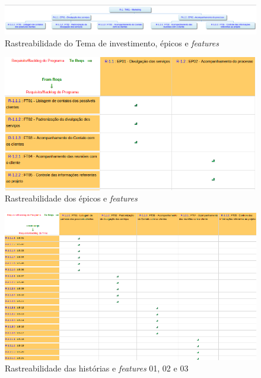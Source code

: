\begin{figure}[!htb]
 \centering
 \includegraphics[scale= 0.5, angle=-90]{figuras/rastreabilidade_ferramenta.png}
 \caption{Rastreabilidade do Tema de investimento, épicos e \textit{features}}
 \label{fig:rastreabilidade}
\end{figure}

\begin{figure}[!htb]
 \centering
 \includegraphics[scale= 0.5]{figuras/epft.png}
 \caption{Rastreabilidade dos épicos e \textit{features}}
 \label{fig:epft}
\end{figure}

\begin{figure}[!htb]
 \centering
 \includegraphics[scale= 0.8]{figuras/ft01e02.png}
 \caption{Rastreabilidade das histórias e \textit{features} 01, 02 e 03}
 \label{fig:ft01}
\end{figure}

